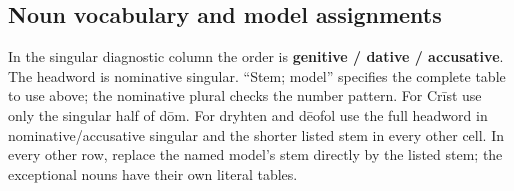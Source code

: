 \subsection*{Noun vocabulary and model assignments}

In the singular diagnostic column the order is \textbf{genitive /\allowbreak{} dative /\allowbreak{} accusative}. The headword is nominative singular. “Stem; model” specifies the complete table to use above; the nominative plural checks the number pattern. For Crīst use only the singular half of dōm. For dryhten and dēofol use the full headword in nominative/\allowbreak{}accusative singular and the shorter listed stem in every other cell. In every other row, replace the named model's stem directly by the listed stem; the exceptional nouns have their own literal tables.

